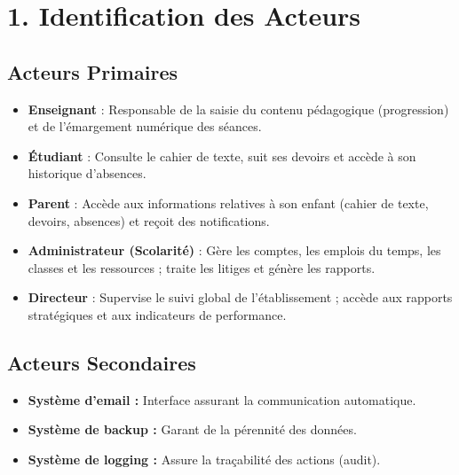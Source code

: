 \documentclass[a4paper, 11pt]{article}
\begin{document}
\section*{1. Identification des Acteurs}

\subsection*{Acteurs Primaires}

\begin{itemize}
    \item \textbf{Enseignant} : Responsable de la saisie du contenu pédagogique (progression) et de l'émargement numérique des séances.
    \item \textbf{Étudiant} : Consulte le cahier de texte, suit ses devoirs et accède à son historique d'absences.
    \item \textbf{Parent} : Accède aux informations relatives à son enfant (cahier de texte, devoirs, absences) et reçoit des notifications.
    \item \textbf{Administrateur (Scolarité)} : Gère les comptes, les emplois du temps, les classes et les ressources ; traite les litiges et génère les rapports.
    \item \textbf{Directeur} : Supervise le suivi global de l'établissement ; accède aux rapports stratégiques et aux indicateurs de performance.
\end{itemize}

\subsection*{Acteurs Secondaires}
\begin{itemize}
    \item \textbf{Système d'email :} Interface assurant la communication automatique.
    \item \textbf{Système de backup :} Garant de la pérennité des données.
    \item \textbf{Système de logging :} Assure la traçabilité des actions (audit).
\end{itemize}
\end{document}
